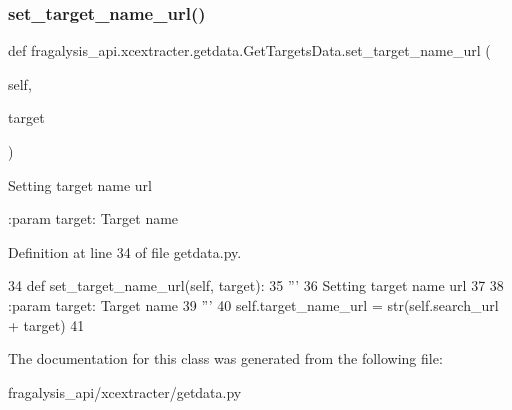 \subsubsection{\texorpdfstring{set\+\_\+target\+\_\+name\+\_\+url()}{set\_target\_name\_url()}}
{\footnotesize\ttfamily def fragalysis\+\_\+api.\+xcextracter.\+getdata.\+Get\+Targets\+Data.\+set\+\_\+target\+\_\+name\+\_\+url (\begin{DoxyParamCaption}\item[{}]{self,  }\item[{}]{target }\end{DoxyParamCaption})}

\begin{DoxyVerb}Setting target name url

:param target: Target name
\end{DoxyVerb}
 

Definition at line 34 of file getdata.\+py.


\begin{DoxyCode}
34     \textcolor{keyword}{def }set\_target\_name\_url(self, target):
35         \textcolor{stringliteral}{'''}
36 \textcolor{stringliteral}{        Setting target name url}
37 \textcolor{stringliteral}{}
38 \textcolor{stringliteral}{        :param target: Target name}
39 \textcolor{stringliteral}{        '''}
40         self.target\_name\_url = str(self.search\_url + target)
41 
\end{DoxyCode}


The documentation for this class was generated from the following file\+:\begin{DoxyCompactItemize}
\item 
fragalysis\+\_\+api/xcextracter/getdata.\+py\end{DoxyCompactItemize}
